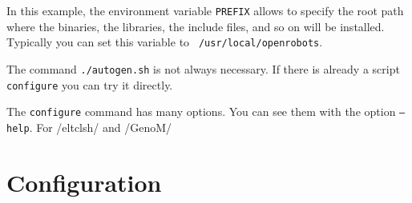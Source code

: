 In this example, the environment variable {\tt PREFIX} allows to specify
the root path where the binaries, the libraries, the include files, and
so on will be installed. Typically you can set this variable to {\tt
/usr/local/openrobots}.

\begin{cartouche}
\end{cartouche}

The command {\tt ./autogen.sh} is not always necessary. If there is
already a script {\tt configure} you can try it directly.

The {\tt configure} command has many options. You can see them with the
option {\tt --help}. For /eltclsh/ and /GenoM/

\section{Configuration}
\label{sec|configuration|configuration}


